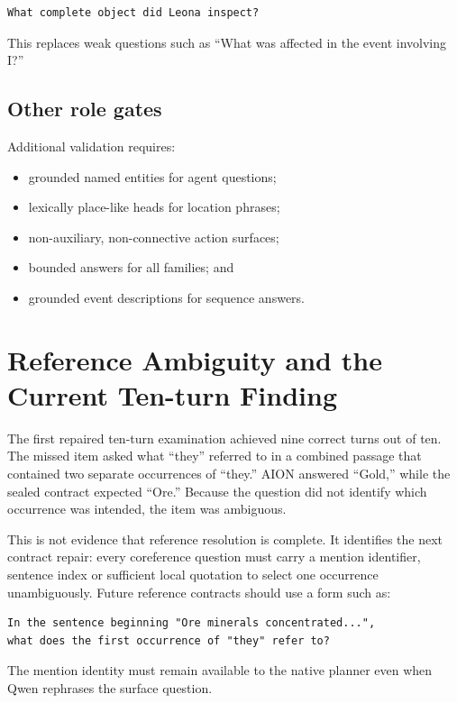 \documentclass[11pt,a4paper]{article}
\begin{document}
\begin{lstlisting}
What complete object did Leona inspect?
\end{lstlisting}

This replaces weak questions such as ``What was affected in the event involving I?''

\subsection{Other role gates}

Additional validation requires:

\begin{itemize}
  \item grounded named entities for agent questions;
  \item lexically place-like heads for location phrases;
  \item non-auxiliary, non-connective action surfaces;
  \item bounded answers for all families; and
  \item grounded event descriptions for sequence answers.
\end{itemize}

\section{Reference Ambiguity and the Current Ten-turn Finding}

The first repaired ten-turn examination achieved nine correct turns out of ten.  The missed item
asked what ``they'' referred to in a combined passage that contained two separate occurrences of
``they.''  AION answered ``Gold,'' while the sealed contract expected ``Ore.''  Because the
question did not identify which occurrence was intended, the item was ambiguous.

This is not evidence that reference resolution is complete.  It identifies the next contract
repair: every coreference question must carry a mention identifier, sentence index or sufficient
local quotation to select one occurrence unambiguously.  Future reference contracts should use
a form such as:

\begin{lstlisting}
In the sentence beginning "Ore minerals concentrated...",
what does the first occurrence of "they" refer to?
\end{lstlisting}

The mention identity must remain available to the native planner even when Qwen rephrases the
surface question.
\end{document}
